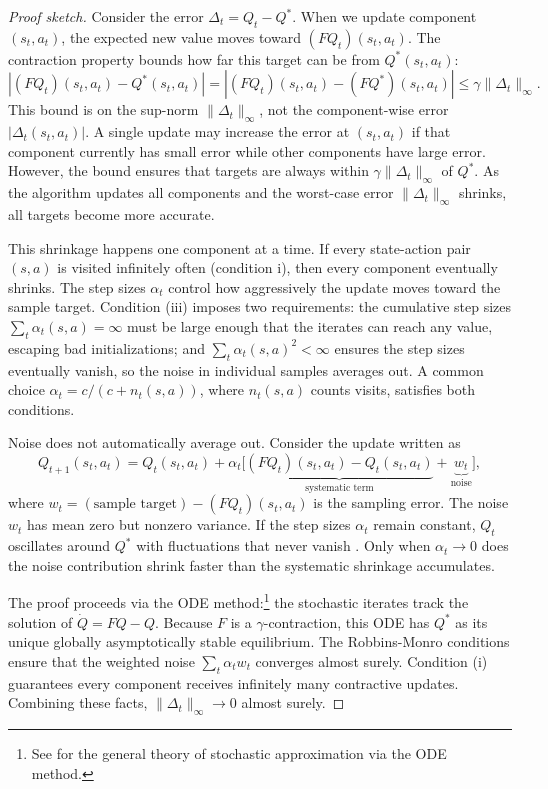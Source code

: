 \begin{proof}[Proof sketch]
Consider the error $\Delta_t = Q_t - Q^*$. When we update component $(s_t, a_t)$, the expected new value moves toward $(FQ_t)(s_t, a_t)$. The contraction property bounds how far this target can be from $Q^*(s_t, a_t)$:
\[
|(FQ_t)(s_t, a_t) - Q^*(s_t, a_t)| = |(FQ_t)(s_t, a_t) - (FQ^*)(s_t, a_t)| \leq \gamma \|\Delta_t\|_\infty.
\]
This bound is on the sup-norm $\|\Delta_t\|_\infty$, not the component-wise error $|\Delta_t(s_t,a_t)|$. A single update may increase the error at $(s_t,a_t)$ if that component currently has small error while other components have large error. However, the bound ensures that targets are always within $\gamma \|\Delta_t\|_\infty$ of $Q^*$. As the algorithm updates all components and the worst-case error $\|\Delta_t\|_\infty$ shrinks, all targets become more accurate.

This shrinkage happens one component at a time. If every state-action pair $(s,a)$ is visited infinitely often (condition i), then every component eventually shrinks. The step sizes $\alpha_t$ control how aggressively the update moves toward the sample target. Condition (iii) imposes two requirements: the cumulative step sizes $\sum_t \alpha_t(s,a) = \infty$ must be large enough that the iterates can reach any value, escaping bad initializations; and $\sum_t \alpha_t(s,a)^2 < \infty$ ensures the step sizes eventually vanish, so the noise in individual samples averages out. A common choice $\alpha_t = c/(c + n_t(s,a))$, where $n_t(s,a)$ counts visits, satisfies both conditions.

Noise does not automatically average out. Consider the update written as
\[
Q_{t+1}(s_t, a_t) = Q_t(s_t, a_t) + \alpha_t \bigl[ \underbrace{(FQ_t)(s_t, a_t) - Q_t(s_t, a_t)}_{\text{systematic term}} + \underbrace{w_t}_{\text{noise}} \bigr],
\]
where $w_t = (\text{sample target}) - (FQ_t)(s_t, a_t)$ is the sampling error. The noise $w_t$ has mean zero but nonzero variance. If the step sizes $\alpha_t$ remain constant, $Q_t$ oscillates around $Q^*$ with fluctuations that never vanish \citep{bertsekas2019}. Only when $\alpha_t \to 0$ does the noise contribution shrink faster than the systematic shrinkage accumulates.

The proof proceeds via the ODE method:\footnote{See \citet{borkar2000} for the general theory of stochastic approximation via the ODE method.} the stochastic iterates track the solution of $\dot{Q} = FQ - Q$. Because $F$ is a $\gamma$-contraction, this ODE has $Q^*$ as its unique globally asymptotically stable equilibrium. The Robbins-Monro conditions ensure that the weighted noise $\sum_t \alpha_t w_t$ converges almost surely. Condition (i) guarantees every component receives infinitely many contractive updates. Combining these facts, $\|\Delta_t\|_\infty \to 0$ almost surely.
\end{proof}

